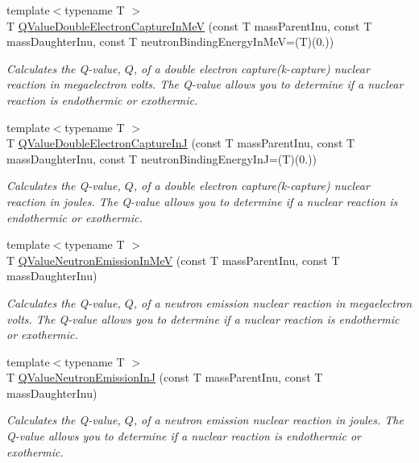 \begin{DoxyCompactItemize}
{\footnotesize template$<$typename T $>$ }\\T \mbox{\hyperlink{group___e_g_x_phys-_q_value-_electron_capture_gab16ac92ae27b2c0c96c7abc35f949cb8}{Q\+Value\+Double\+Electron\+Capture\+In\+MeV}} (const T mass\+Parent\+Inu, const T mass\+Daughter\+Inu, const T neutron\+Binding\+Energy\+In\+MeV=(T)(0.))
\begin{DoxyCompactList}\small\item\em Calculates the Q-\/value, $Q$, of a double electron capture(k-\/capture) nuclear reaction in megaelectron volts. The Q-\/value allows you to determine if a nuclear reaction is endothermic or exothermic. \end{DoxyCompactList}\item 
{\footnotesize template$<$typename T $>$ }\\T \mbox{\hyperlink{group___e_g_x_phys-_q_value-_electron_capture_gacb431a07ac565f8e48a08c25544e5d22}{Q\+Value\+Double\+Electron\+Capture\+InJ}} (const T mass\+Parent\+Inu, const T mass\+Daughter\+Inu, const T neutron\+Binding\+Energy\+InJ=(T)(0.))
\begin{DoxyCompactList}\small\item\em Calculates the Q-\/value, $Q$, of a double electron capture(k-\/capture) nuclear reaction in joules. The Q-\/value allows you to determine if a nuclear reaction is endothermic or exothermic. \end{DoxyCompactList}\item 
{\footnotesize template$<$typename T $>$ }\\T \mbox{\hyperlink{group___e_g_x_phys-_q_value-_neutron_emission_ga8ad6e53cb04260eb9b140e22b5b6d9f6}{Q\+Value\+Neutron\+Emission\+In\+MeV}} (const T mass\+Parent\+Inu, const T mass\+Daughter\+Inu)
\begin{DoxyCompactList}\small\item\em Calculates the Q-\/value, $Q$, of a neutron emission nuclear reaction in megaelectron volts. The Q-\/value allows you to determine if a nuclear reaction is endothermic or exothermic. \end{DoxyCompactList}\item 
{\footnotesize template$<$typename T $>$ }\\T \mbox{\hyperlink{group___e_g_x_phys-_q_value-_neutron_emission_gacb17fa06731637937bc65765943d67ca}{Q\+Value\+Neutron\+Emission\+InJ}} (const T mass\+Parent\+Inu, const T mass\+Daughter\+Inu)
\begin{DoxyCompactList}\small\item\em Calculates the Q-\/value, $Q$, of a neutron emission nuclear reaction in joules. The Q-\/value allows you to determine if a nuclear reaction is endothermic or exothermic. \end{DoxyCompactList}\item 

\end{DoxyCompactItemize}
